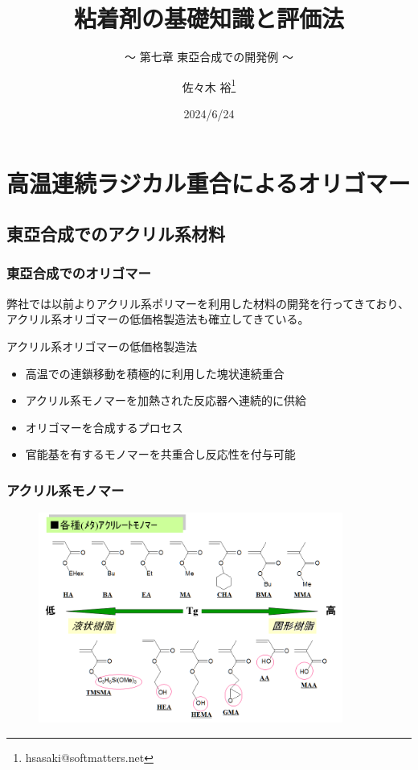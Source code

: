 \documentclass[unicode,12pt]{beamer}%
\title{粘着剤の基礎知識と評価法}
\subtitle{～ 第七章 東亞合成での開発例 ～}
\author[SDL Inc. 佐々木]{佐々木 裕\thanks{hsasaki@softmatters.net}}
\institute[]{元 東亞合成株式会社\\ソフトマターデザインラボ合同会社}
\date{2024/6/24}
\begin{document}
\maketitle

\begin{frame} 
    \tableofcontents[]
\end{frame} 

\section{高温連続ラジカル重合によるオリゴマー}
\subsection{東亞合成でのアクリル系材料}
\begin{frame}
	\frametitle{東亞合成でのオリゴマー}
		弊社では以前よりアクリル系ポリマーを利用した材料の開発を行ってきており、アクリル系オリゴマーの低価格製造法も確立してきている。

		\begin{block}{アクリル系オリゴマーの低価格製造法}
		\begin{itemize}
		\item 高温での連鎖移動を積極的に利用した塊状連続重合
		\item アクリル系モノマーを加熱された反応器へ連続的に供給
		\item オリゴマーを合成するプロセス
		\item 官能基を有するモノマーを共重合し反応性を付与可能
		\end{itemize}
		\end{block}
\end{frame}

\begin{frame}\frametitle{アクリル系モノマー}
\begin{figure}[!b]
	\begin{center}
		\includegraphics[width=100mm]{monomers.png}
	\end{center}
\end{figure}
\end{frame}
\end{document}
